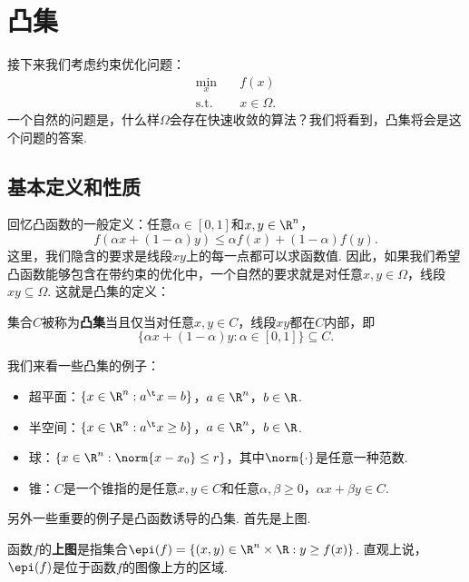 \section{凸集}
接下来我们考虑约束优化问题：
\begin{align*}
    \min_x &\quad f(x)\\
    \text{s.t.}&\quad x\in \Omega.
\end{align*}
一个自然的问题是，什么样$\Omega$会存在快速收敛的算法？我们将看到，凸集将会是这个问题的答案.

\subsection{基本定义和性质}
回忆凸函数的一般定义：任意$\alpha\in[0,1]$和$x,y\in\R^n$，
    \[
        f(\alpha x+(1-\alpha) y)\leq \alpha f(x)+(1-\alpha) f(y).
    \]
这里，我们隐含的要求是线段$xy$上的每一点都可以求函数值. 因此，如果我们希望凸函数能够包含在带约束的优化中，一个自然的要求就是对任意$x,y\in \Omega$，线段$xy\subseteq \Omega$. 这就是凸集的定义：

\begin{definition}[凸集]
集合$C$被称为\textbf{凸集}当且仅当对任意$x,y\in C$，线段$xy$都在$C$内部，即
\[\{\alpha x+(1-\alpha)y:\alpha\in [0,1]\}\subseteq C.\]
\end{definition}

我们来看一些凸集的例子：
\begin{example}
\begin{itemize}
    \item 超平面：$\{x\in\R^n:a^\t x= b\}$，$a\in\R^n$，$b\in\R$. 
    \item 半空间：$\{x\in\R^n:a^\t x\geq b\}$，$a\in\R^n$，$b\in\R$. 
    \item 球：$\{x\in\R^n:\norm{x-x_0}\leq r\}$，其中$\norm{\cdot}$是任意一种范数. 
    \item 锥：$C$是一个锥指的是任意$x,y\in C$和任意$\alpha,\beta\geq 0$，$\alpha x+\beta y\in C$. 
\end{itemize}
\end{example}

另外一些重要的例子是凸函数诱导的凸集. 首先是上图. 

\begin{definition}[上图]
    函数$f$的\textbf{上图}是指集合$\epi(f)=\{(x,y)\in\R^{n}\times\R:y\geq f(x)\}$. 直观上说，$\epi(f)$是位于函数$f$的图像上方的区域.
\end{definition}


